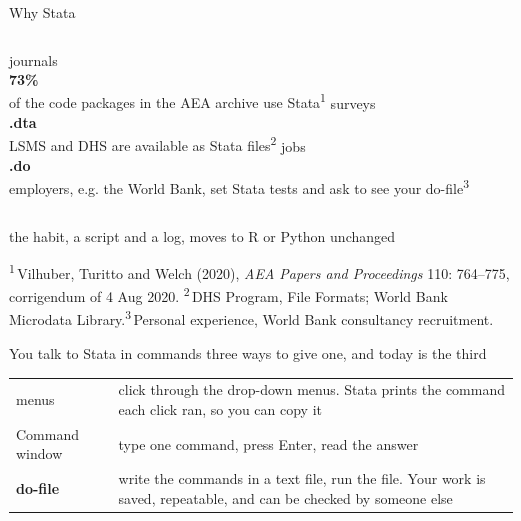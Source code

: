 \documentclass[aspectratio=169,11pt]{beamer}
\begin{document}
\begin{frame}{Why Stata}
  \vspace*{0.6cm}
  \begin{columns}[T]
    \centering
      {\ttfamily\color{SlateTeal}journals}\\[0.5em]
      {\fontsize{34}{36}\selectfont\bfseries\color{PromptMaroon}\vphantom{jl}73\%}\\[0.5em]
      {\small of the code packages in the AEA archive use Stata\textsuperscript{1}}
    \centering
      {\ttfamily\color{SlateTeal}surveys}\\[0.5em]
      {\fontsize{34}{36}\selectfont\bfseries\color{PromptMaroon}\vphantom{jl}.dta}\\[0.5em]
      {\small LSMS and DHS are available as Stata files\textsuperscript{2}}
    \centering
      {\ttfamily\color{SlateTeal}jobs}\\[0.5em]
      {\fontsize{34}{36}\selectfont\bfseries\color{PromptMaroon}\vphantom{jl}.do}\\[0.5em]
      {\small employers, e.g. the World Bank, set Stata tests and ask to see your do-file\textsuperscript{3}}
  \end{columns}
  \vspace*{0.6cm}\centering
  {\color{WarmGray}\small the habit, a script and a log, moves to R or Python unchanged}
  \vfill
  \begin{flushleft}
  {\color{WarmGray}\scriptsize \textsuperscript{1}\,Vilhuber, Turitto and Welch (2020), \emph{AEA Papers and Proceedings} 110: 764--775, corrigendum of 4 Aug 2020.\quad
  \textsuperscript{2}\,DHS Program, File Formats; World Bank Microdata Library.\quad \textsuperscript{3}\,Personal experience, World Bank consultancy recruitment.}
  \end{flushleft}
\end{frame}

\begin{frame}{You talk to Stata in commands}
  \vfill\centering
  {\color{WarmGray}three ways to give one, and today is the third}\\[1.4em]
  \begin{tabular}{@{}l>{\RaggedRight\arraybackslash}p{8.4cm}@{}}
    {\ttfamily\color{WarmGray}menus} & click through the drop-down menus. Stata prints the command each click ran, so you can copy it\\[0.6em]
    {\ttfamily\color{WarmGray}Command window} & type one command, press Enter, read the answer\\[0.6em]
    {\ttfamily\bfseries\color{PromptMaroon}do-file} & write the commands in a text file, run the file. Your work is saved, repeatable, and can be checked by someone else\\
  \end{tabular}
  \vfill
\end{frame}
\end{document}

